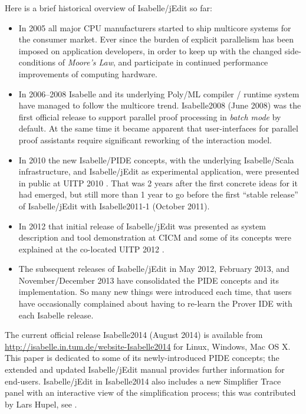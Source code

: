 \begin{isabellebody}
\begin{isamarkuptext}
\medskip Here is a brief historical overview of Isabelle/jEdit so far:

\begin{itemize}

\item In 2005 all major CPU manufacturers started to ship multicore systems
for the consumer market. Ever since the burden of explicit parallelism has
been imposed on application developers, in order to keep up with the changed
side-conditions of \emph{Moore's Law}, and participate in continued
performance improvements of computing hardware.

\item In 2006--2008 Isabelle and its underlying Poly/ML compiler / runtime
system have managed to follow the multicore trend. Isabelle2008 (June 2008)
was the first official release to support parallel proof processing in
\emph{batch mode} by default. At the same time it became apparent that
user-interfaces for parallel proof assistants require significant reworking
of the interaction model.

\item In 2010 the new Isabelle/PIDE concepts, with the underlying
Isabelle/Scala infrastructure, and Isabelle/jEdit as experimental
application, were presented in public at UITP 2010 \cite{Wenzel:2010}. That
was 2 years after the first concrete ideas for it had emerged, but still
more than 1 year to go before the first ``stable release'' of Isabelle/jEdit
with Isabelle2011-1 (October 2011).

\item In 2012 that initial release of Isabelle/jEdit was presented as system
description and tool demonstration at CICM \cite{Wenzel:2012:CICM} and some
of its concepts were explained at the co-located UITP 2012
\cite{Wenzel:2012:UITP-EPTCS}.

\item The subsequent releases of Isabelle/jEdit in May 2012, February 2013,
and November/December 2013 have consolidated the PIDE concepts and its
implementation. So many new things were introduced each time, that users
have occasionally complained about having to re-learn the Prover IDE with
each Isabelle release.

\end{itemize}

\medskip The current official release Isabelle2014 (August 2014) is
available from \url{http://isabelle.in.tum.de/website-Isabelle2014} for
Linux, Windows, Mac OS X. This paper is dedicated to some of its
newly-introduced PIDE concepts; the extended and updated Isabelle/jEdit
manual \cite{isabelle-jedit-manual} provides further information for
end-users. Isabelle/jEdit in Isabelle2014 also includes a new Simplifier
Trace panel with an interactive view of the simplification process; this was
contributed by Lars Hupel, see \cite{Hupel:2014}.


\end{isamarkuptext}
\end{isabellebody}

